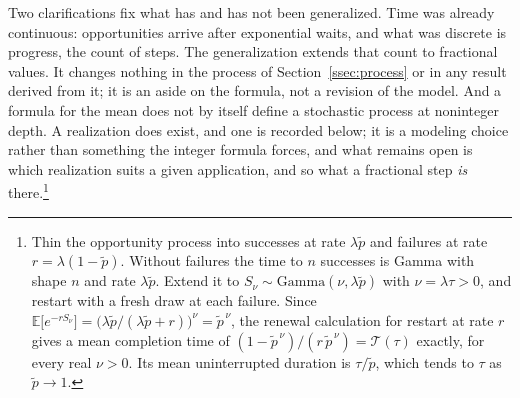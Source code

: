 \documentclass{article}
\begin{document}
Two clarifications fix what has and has not been generalized. Time was already continuous: opportunities arrive after exponential waits, and what was discrete is progress, the count of steps. The generalization extends that count to fractional values. It changes nothing in the process of Section~\ref{ssec:process} or in any result derived from it; it is an aside on the formula, not a revision of the model. And a formula for the mean does not by itself define a stochastic process at noninteger depth. A realization does exist, and one is recorded below; it is a modeling choice rather than something the integer formula forces, and what remains open is which realization suits a given application, and so what a fractional step \emph{is} there.\footnote{Thin the opportunity process into successes at rate $\lambda\widetilde{p}$ and failures at rate $r = \lambda(1 - \widetilde{p})$. Without failures the time to $n$ successes is Gamma with shape $n$ and rate $\lambda\widetilde{p}$. Extend it to $S_\nu \sim \mathrm{Gamma}(\nu, \lambda\widetilde{p})$ with $\nu = \lambda\tau > 0$, and restart with a fresh draw at each failure. Since $\mathbb{E}\big[e^{-rS_\nu}\big] = \big(\lambda\widetilde{p}/(\lambda\widetilde{p} + r)\big)^{\nu} = \widetilde{p}^{\,\nu}$, the renewal calculation for restart at rate $r$ gives a mean completion time of $(1 - \widetilde{p}^{\,\nu})/(r\,\widetilde{p}^{\,\nu}) = \mathcal{T}(\tau)$ exactly, for every real $\nu > 0$. Its mean uninterrupted duration is $\tau/\widetilde{p}$, which tends to $\tau$ as $\widetilde{p} \to 1$.}
\end{document}
